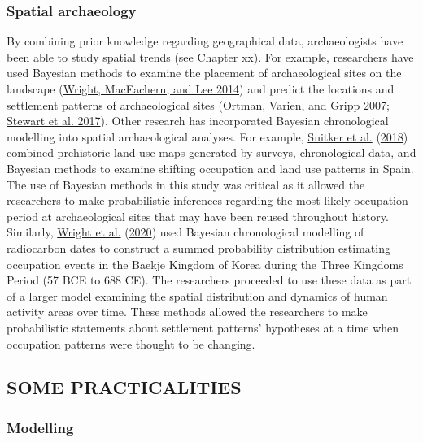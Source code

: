 \documentclass[
]{article}
\begin{document}
\hypertarget{spatial-archaeology}{%
\subsubsection{Spatial archaeology}\label{spatial-archaeology}}

By combining prior knowledge regarding geographical data, archaeologists
have been able to study spatial trends (see Chapter xx). For example,
researchers have used Bayesian methods to examine the placement of
archaeological sites on the landscape
(\protect\hyperlink{ref-wright_analysis_2014}{Wright, MacEachern, and
Lee 2014}) and predict the locations and settlement patterns of
archaeological sites
(\protect\hyperlink{ref-ortman_empirical_2007}{Ortman, Varien, and Gripp
2007}; \protect\hyperlink{ref-stewart_novel_2017}{Stewart et al. 2017}).
Other research has incorporated Bayesian chronological modelling into
spatial archaeological analyses. For example,
\protect\hyperlink{ref-snitker_patch-based_2018}{Snitker et al.}
(\protect\hyperlink{ref-snitker_patch-based_2018}{2018}) combined
prehistoric land use maps generated by surveys, chronological data, and
Bayesian methods to examine shifting occupation and land use patterns in
Spain. The use of Bayesian methods in this study was critical as it
allowed the researchers to make probabilistic inferences regarding the
most likely occupation period at archaeological sites that may have been
reused throughout history. Similarly,
\protect\hyperlink{ref-wright_spatial_2020}{Wright et al.}
(\protect\hyperlink{ref-wright_spatial_2020}{2020}) used Bayesian
chronological modelling of radiocarbon dates to construct a summed
probability distribution estimating occupation events in the Baekje
Kingdom of Korea during the Three Kingdoms Period (57 BCE to 688 CE).
The researchers proceeded to use these data as part of a larger model
examining the spatial distribution and dynamics of human activity areas
over time. These methods allowed the researchers to make probabilistic
statements about settlement patterns' hypotheses at a time when
occupation patterns were thought to be changing. \newpage

\hypertarget{some-practicalities}{%
\subsection{\texorpdfstring{\hfil SOME
PRACTICALITIES\hfil}{SOME PRACTICALITIES}}\label{some-practicalities}}

\hypertarget{modelling}{%
\subsubsection{Modelling}\label{modelling}}
\end{document}
